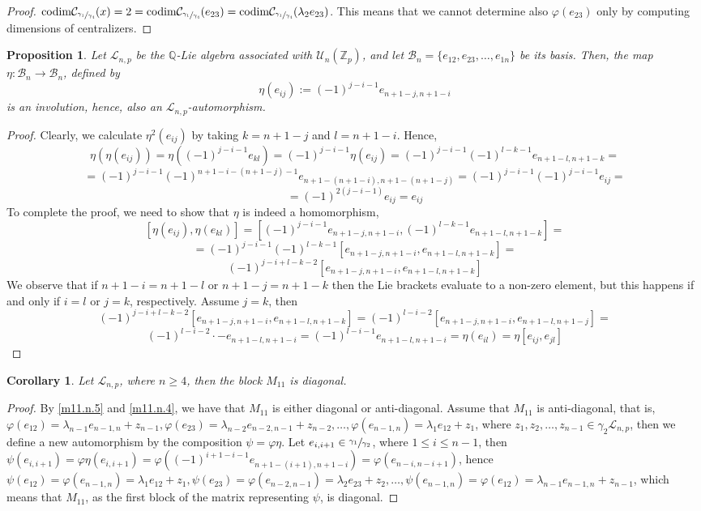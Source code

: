 \documentclass[12pt]{article}
\newtheorem{proposition}[theorem]{Proposition}
\newtheorem{corollary}[theorem]{Corollary}
\begin{document}
\begin{proof}
$\mathrm{codim}\mathcal{C}_{\sfrac{\gamma_1}{\gamma_4}}(x)=2=\mathrm{codim}\mathcal{C}_{\sfrac{\gamma_1}{\gamma_4}}(e_{23})=\mathrm{codim}\mathcal{C}_{\sfrac{\gamma_1}{\gamma_4}}(\lambda_2 e_{23})$. This means that we cannot determine also $\varphi(e_{23})$ only by computing dimensions of centralizers.
\end{proof}
\begin{proposition}
\label{prop.involution}
Let $\mathcal{L}_{n,p}$ be the $\mathbb{Q}$-Lie algebra associated with $\mathcal{U}_n(\mathbb{Z}_p)$, and let $\mathcal{B}_n=\{e_{12},e_{23},\dots,e_{1n}\}$ be its basis. Then, the map $\eta:\mathcal{B}_n\rightarrow \mathcal{B}_n$, defined by \[\eta(e_{ij}):=(-1)^{j-i-1}e_{n+1-j,n+1-i}\] is an involution, hence, also an $\mathcal{L}_{n,p}$-automorphism.
\end{proposition}
\begin{proof}
Clearly, we calculate $\eta^2(e_{ij})$ by taking $k=n+1-j$ and $l=n+1-i$. Hence, \[\eta(\eta(e_{ij}))=\eta((-1)^{j-i-1}e_{kl})=(-1)^{j-i-1}\eta(e_{ij})=(-1)^{j-i-1}(-1)^{l-k-1}e_{n+1-l,n+1-k}=\]\[=(-1)^{j-i-1}(-1)^{n+1-i-(n+1-j)-1}e_{n+1-(n+1-i),n+1-(n+1-j)}=(-1)^{j-i-1}(-1)^{j-i-1}e_{ij}=\]\[=(-1)^{2(j-i-1)}e_{ij}=e_{ij}\]
To complete the proof, we need to show that $\eta$ is indeed a homomorphism,
\[[\eta(e_{ij}),\eta(e_{kl})]=[(-1)^{j-i-1}e_{n+1-j,n+1-i},(-1)^{l-k-1}e_{n+1-l,n+1-k}]=\]\[=(-1)^{j-i-1}(-1)^{l-k-1}[e_{n+1-j,n+1-i},e_{n+1-l,n+1-k}]=\]\[(-1)^{j-i+l-k-2}[e_{n+1-j,n+1-i},e_{n+1-l,n+1-k}]\]
We observe that if $n+1-i=n+1-l$ or $n+1-j=n+1-k$ then the Lie brackets evaluate to a non-zero element, but this happens if and only if $i=l$ or $j=k$, respectively. Assume $j=k$, then \[(-1)^{j-i+l-k-2}[e_{n+1-j,n+1-i},e_{n+1-l,n+1-k}]=(-1)^{l-i-2}[e_{n+1-j,n+1-i},e_{n+1-l,n+1-j}]=\]\[(-1)^{l-i-2}\cdot-e_{n+1-l,n+1-i}=(-1)^{l-i-1}e_{n+1-l,n+1-i}=\eta(e_{il})=\eta[e_{ij},e_{jl}]\] 
\end{proof}
\begin{corollary}
\label{m11.diagonal}
Let $\mathcal{L}_{n,p}$, where $n\geq 4$, then the block $M_{11}$ is diagonal.
\end{corollary}
\begin{proof}
By \ref{m11.n.5} and \ref{m11.n.4}, we have that $M_{11}$ is either diagonal or anti-diagonal. Assume that $M_{11}$ is anti-diagonal, that is, $\varphi(e_{12})=\lambda_{n-1}e_{n-1,n}+z_{n-1},\varphi(e_{23})=\lambda_{n-2} e_{n-2,n-1}+z_{n-2},\dots,\varphi(e_{n-1,n})=\lambda_1 e_{12}+z_1$, where $z_1,z_2,\dots,z_{n-1}\in\gamma_2\mathcal{L}_{n,p}$, then we define a new automorphism by the composition $\psi=\varphi\eta$. Let $e_{i,i+1}\in\sfrac{\gamma_1}{\gamma_2}$, where $1\leq i\leq n-1$, then $\psi(e_{i,i+1})=\varphi\eta(e_{i,i+1})=\varphi((-1)^{i+1-i-1}e_{n+1-(i+1),n+1-i})=\varphi(e_{n-i,n-i+1})
$, hence $\psi(e_{12})=\varphi(e_{n-1,n})=\lambda_1 e_{12}+z_1,\psi(e_{23})=\varphi(e_{n-2,n-1})=\lambda_2 e_{23}+z_2,\dots,\psi(e_{n-1,n})=\varphi(e_{12})=\lambda_{n-1}e_{n-1,n}+z_{n-1}$, which means that $M_{11}$, as the first block of the matrix representing $\psi$, is diagonal.  
\end{proof}
\end{document}
